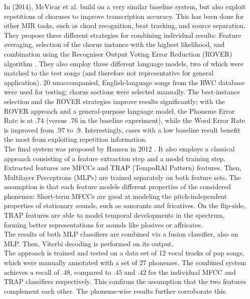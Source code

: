 In \cite{McVicar2014} (2014), McVicar et al. build on a very similar baseline system, but also exploit repetitions of choruses to improve transcription accuracy. This has been done for other MIR tasks, such as chord recognition, beat tracking, and source separation. They propose three different strategies for combining individual results: Feature averaging, selection of the chorus instance with the highest likelihood, and combination using the Recogniser Output Voting Error Reduction (ROVER) algorithm \cite{rover}. They also employ three different language models, two of which were matched to the test songs (and therefore not representative for general application). 20 unaccompanied, English-language songs from the RWC database \cite{rwc} were used for testing; chorus sections were selected manually. The best-instance selection and the ROVER strategies improve results significantly; with the ROVER approach and a general-purpose language model, the Phoneme Error Rate is at $.74$ (versus $.76$ in the baseline experiment), while the Word Error Rate is improved from $.97$ to $.9$. Interestingly, cases with a low baseline result benefit the most from exploiting repetition information.\\

The final system was proposed by Hansen in 2012 \cite{jens}. It also employs a classical approach consisting of a feature extraction step and a model training step. Extracted features are MFCCs and TRAP (TempoRAl Pattern) features. Then, Multilayer Perceptrons (MLPs) are trained separately on both feature sets. The assumption is that each feature models different properties of the considered phonemes: Short-term MFCCs are good at modeling the pitch-independent properties of stationary sounds, such as sonorants and fricatives. On the flip-side, TRAP features are able to model temporal developments in the spectrum, forming better representations for sounds like plosives or affricates.\\
The results of both MLP classifiers are combined via a fusion classifier, also an MLP. Then, Viterbi decoding is performed on its output.\\
The approach is trained and tested on a data set of 12 vocal tracks of pop songs, which were manually annotated with a set of 27 phonemes. The combined system achieves a recall of $.48$, compared to $.45$ and $.42$ for the individual MFCC and TRAP classifiers respectively. This confirms the assumption that the two features complement each other. The phoneme-wise results further corroborate this.

